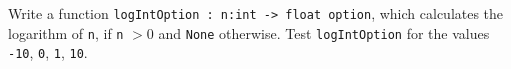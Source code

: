 \label{logIntOption} Write a function \lstinline{logIntOption : n:int -> float option}, which calculates the logarithm of \lstinline{n}, if \lstinline{n} $>0$ and \lstinline{None} otherwise. Test \lstinline{logIntOption} for the values \lstinline{-10}, \lstinline{0}, \lstinline{1}, \lstinline{10}.